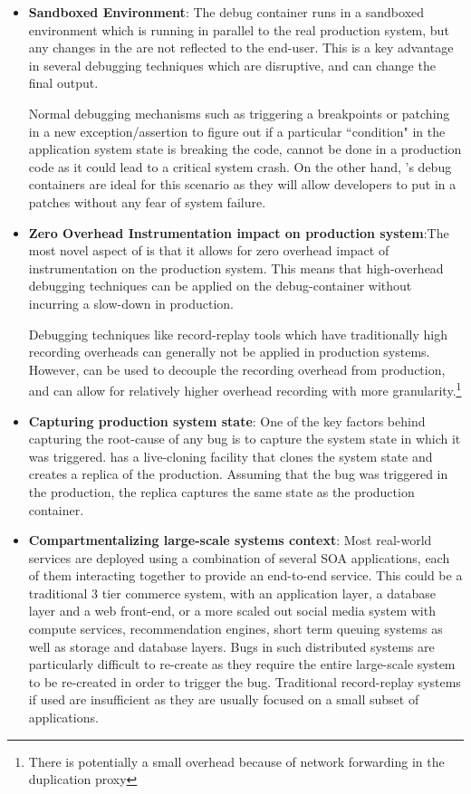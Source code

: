 \begin{itemize}
	
	\item \textbf{Sandboxed Environment}: The debug container runs in a sandboxed environment which is running in parallel to the real production system, but any changes in the \debugcontainer are not reflected to the end-user. This is a key advantage in several debugging techniques which are disruptive, and can change the final output. 
	
	Normal debugging mechanisms such as triggering a breakpoints or patching in a new exception/assertion to figure out if a particular ``condition" in the application system state is breaking the code, cannot be done in a production code as it could lead to a critical system crash. On the other hand, \parikshan's debug containers are ideal for this scenario as they will allow developers to put in a patches without any fear of system failure.
	
	\item \textbf{Zero Overhead Instrumentation impact on production system}:The most novel aspect of \parikshan is that it allows for zero overhead impact of instrumentation on the production system. This means that high-overhead debugging techniques can be applied on the debug-container without incurring a slow-down in production.
	
	Debugging techniques like record-replay tools which have traditionally high recording overheads can generally not be applied in production systems. However, \parikshan can be used to decouple the recording overhead from production, and can allow for relatively higher overhead recording with more granularity.\footnote{There is potentially a small overhead because of network forwarding in the duplication proxy}
	
	\item \textbf{Capturing production system state}:
	One of the key factors behind capturing the root-cause of any bug is to capture the system state in which it was triggered. \parikshan has a live-cloning facility that clones the system state and creates a replica of the production. Assuming that the bug was triggered in the production, the replica captures the same state as the production container.
	
	\item \textbf{Compartmentalizing large-scale systems context}:
	Most real-world services are deployed using a combination of several SOA applications, each of them interacting together to provide an end-to-end service. This could be a traditional 3 tier commerce system, with an application layer, a database layer and a web front-end, or a more scaled out social media system with compute services, recommendation engines, short term queuing systems as well as storage and database layers. 
	Bugs in such distributed systems are particularly difficult to re-create as they require the entire large-scale system to be re-created in order to trigger the bug. 
	Traditional record-replay systems if used are insufficient as they are usually focused on a small subset of applications.
	

\end{itemize}
